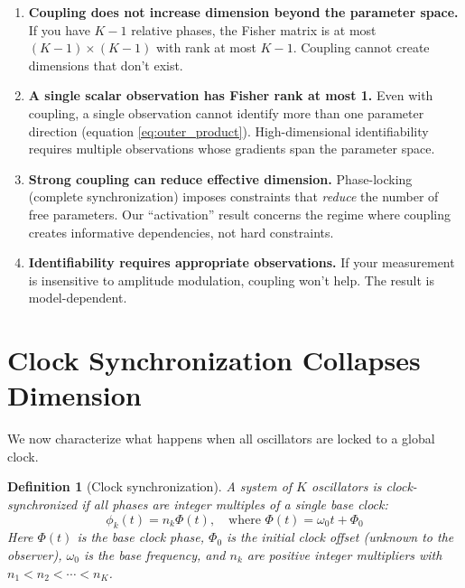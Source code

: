\documentclass[12pt]{article}
\newtheorem{definition}[theorem]{Definition}
\begin{document}
\begin{enumerate}
    \item \textbf{Coupling does not increase dimension beyond the parameter space.} If you have $K-1$ relative phases, the Fisher matrix is at most $(K-1) \times (K-1)$ with rank at most $K-1$. Coupling cannot create dimensions that don't exist.

    \item \textbf{A single scalar observation has Fisher rank at most 1.} Even with coupling, a single observation cannot identify more than one parameter direction (equation \eqref{eq:outer_product}). High-dimensional identifiability requires multiple observations whose gradients span the parameter space.

    \item \textbf{Strong coupling can reduce effective dimension.} Phase-locking (complete synchronization) imposes constraints that \emph{reduce} the number of free parameters. Our ``activation'' result concerns the regime where coupling creates informative dependencies, not hard constraints.

    \item \textbf{Identifiability requires appropriate observations.} If your measurement is insensitive to amplitude modulation, coupling won't help. The result is model-dependent.
\end{enumerate}

\section{Clock Synchronization Collapses Dimension}
\label{sec:clock}

We now characterize what happens when all oscillators are locked to a global clock.

\begin{definition}[Clock synchronization]
\label{def:clock}
A system of $K$ oscillators is \emph{clock-synchronized} if all phases are integer multiples of a single base clock:
\begin{equation}
\phi_k(t) = n_k \Phi(t), \quad \text{where } \Phi(t) = \omega_0 t + \Phi_0
\end{equation}
Here $\Phi(t)$ is the base clock phase, $\Phi_0$ is the initial clock offset (unknown to the observer), $\omega_0$ is the base frequency, and $n_k$ are positive integer multipliers with $n_1 < n_2 < \cdots < n_K$.
\end{definition}
\end{document}

